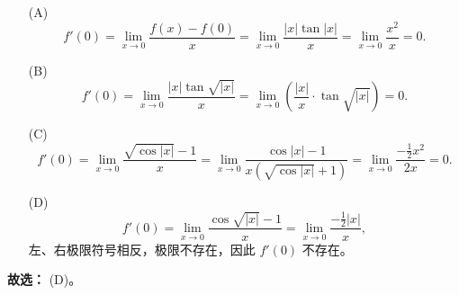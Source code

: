 \begin{enumerate}
          \begin{solution}
              \begin{enumerate}
                  \item[(A)]
                        \[
                            f'(0)=\lim_{x\to0}\frac{f(x)-f(0)}{x}
                            =\lim_{x\to0}\frac{|x|\tan|x|}{x}
                            =\lim_{x\to0}\frac{x^2}{x}=0.
                        \]

                  \item[(B)]
                        \[
                            f'(0)=\lim_{x\to0}\frac{|x|\tan\sqrt{|x|}}{x}
                            =\lim_{x\to0}\left(\frac{|x|}{x}\cdot\tan\sqrt{|x|}\right)=0.
                        \]

                  \item[(C)]
                        \[
                            f'(0)=\lim_{x\to0}\frac{\sqrt{\cos|x|}-1}{x}
                            =\lim_{x\to0}\frac{\cos|x|-1}{x(\sqrt{\cos|x|}+1)}
                            =\lim_{x\to0}\frac{-\frac{1}{2}x^2}{2x}=0.
                        \]

                  \item[(D)]
                        \[
                            f'(0)=\lim_{x\to0}\frac{\cos\sqrt{|x|}-1}{x}
                            =\lim_{x\to0}\frac{-\frac{1}{2}|x|}{x},
                        \]
                        左、右极限符号相反，极限不存在，因此 $f'(0)$ 不存在。
              \end{enumerate}
              \textbf{故选：} (D)。
          \end{solution}
\end{enumerate}